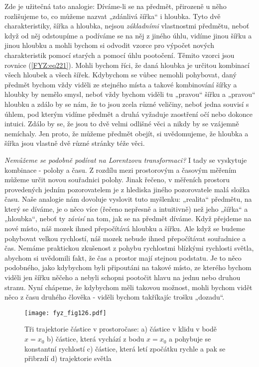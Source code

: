 {    Zde je užitečná tato analogie: Díváme-li se na předmět, přirozeně u něho rozlišujeme to, co 
    můžeme nazvat „zdánlivá šířka“ i hloubka. Tyto dvě charakteristiky, šířka a hloubka, nejsou  
    \emph{základními} vlastnostmi předmětu, neboť když od něj odstoupíme a podíváme se na něj z 
    jiného úhlu, vidíme jinou šířku a jinou hloubku a mohli bychom si odvodit vzorce pro výpočet 
    nových charakteristik pomocí starých a pomocí úhlu pootočení. Těmito vzorci jsou rovnice 
    (\ref{FYZ:eq221}). Mohli bychom říci, že daná hloubka je určitou kombinací všech hloubek a 
    všech šířek. Kdybychom se vůbec nemohli pohybovat, daný předmět bychom vždy viděli ze stejného 
    místa a takové kombinování šířky a hloubky by nemělo smysl, neboť vždy bychom viděli tu 
    „pravou“ šířku a „pravou“ hloubku a zdálo by se nám, že to jsou zcela různé veličiny, neboť 
    jedna souvisí s úhlem, pod kterým vidíme předmět a druhá vyžaduje zaostření očí nebo dokonce 
    intuici. Zdálo by se, že jsou to dvě velmi odlišné věci a nikdy by se vzájemně nemíchaly. Jen 
    proto, že můžeme předmět obejít, si uvědomujeme, že hloubka a šířka jsou vlastně dvě různé 
    stránky téže věci.
     
    \emph{Nemůžeme se podobně podívat na Lorentzovu transformaci?} I tady se vyskytuje kombinace - 
    polohy a času. Z rozdílu mezi prostorovým a časovým měřením můžeme určit novou souřadnici 
    polohy. Jinak řečeno, v měřeních prostoru provedených jedním pozorovatelem je z hlediska jiného 
    pozorovatele malá složka času. Naše analogie nám dovoluje vyslovit tuto myšlenku: „realita“ 
    předmětu, na který se díváme, je o něco více (řečeno nepřesně a intuitivně) než jeho „šířka“ a 
    „hloubka“, neboť ty \emph{závisí} na tom, jak se na předmět díváme. Když přejdeme na nové 
    místo, náš mozek ihned přepočítává hloubku a šířku. Ale když se budeme pohybovat velkou 
    rychlostí, náš mozek nebude ihned přepočítávat souřadnice a čas. Nemáme praktickou zkušenost z 
    pohybu rychlostmi blízkými rychlosti světla, abychom si uvědomili fakt, že čas a prostor mají 
    stejnou podstatu. Je to něco podobného, jako kdybychom byli připoutáni na takové místo, ze 
    kterého bychom viděli jen šířku něčeho a nebyli schopni pootočit hlavu na jednu nebo druhou 
    stranu. Nyní chápeme, že kdybychom měli takovou možnost, mohli bychom vidět něco z času druhého 
    člověka - viděli bychom takříkajíc trošku „dozadu“.

    \begin{figure}[ht!]  %
      \centering
      \texttt{[image: fyz\_fig126.pdf]}
      \caption{Tři trajektorie částice v prostoročase: a) částice v klidu v bodě \(x = x_0\)
               b) částice, která vychází z bodu \(x = x_0\) a pohybuje se konstantní rychlostí
               c) částice, která letí zpočátku rychle a pak se přibrzdí d) trajektorie světla 
               \cite[s.~238]{Feynman01}}
      \label{fyz:fig126}
    \end{figure}
    
}
